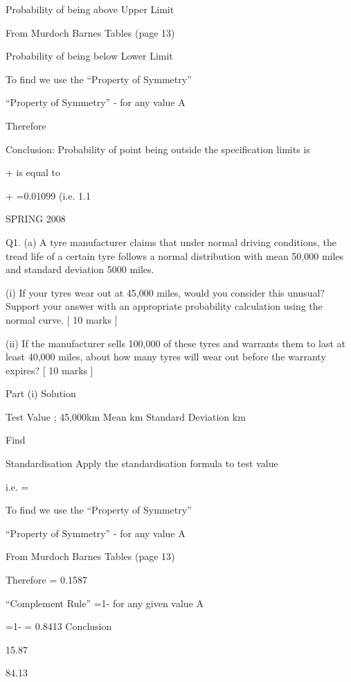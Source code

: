 \documentclass[a4]{beamer}
\begin{document}
Probability of being above Upper Limit

From Murdoch Barnes Tables (page 13)  

Probability of being below Lower Limit


To find   we use the “Property of Symmetry”

“Property of Symmetry” -   for any value A
							
Therefore 

Conclusion: 
Probability of point being outside the specification limits is

 + is equal to

 + =0.01099  	(i.e. 1.1%









SPRING 2008

Q1. (a) A tyre manufacturer claims that under normal driving conditions, the tread life of a certain tyre follows a normal distribution with mean 50,000 miles and standard deviation 5000 miles. 

(i) If your tyres wear out at 45,000 miles, would you consider this unusual? Support your answer with an appropriate probability calculation using the normal curve. [ 10 marks ] 

(ii) If the manufacturer sells 100,000 of these tyres and warrants them to last at least 40,000 miles, about how many tyres will wear out before the warranty expires? [ 10 marks ]

Part (i) Solution

Test Value ; 45,000km			Mean		 km	
						Standard Deviation	 km

Find  

Standardisation
Apply the standardisation formula	 	to test value
 

i.e.  = 

To find   we use the “Property of Symmetry”

“Property of Symmetry” -   for any value A

From Murdoch Barnes Tables (page 13)  

Therefore   = 0.1587 

“Complement Rule”		 =1-  for any given value A
	
 =1-  = 0.8413
Conclusion

15.87%
	
84.13%
\end{document}
